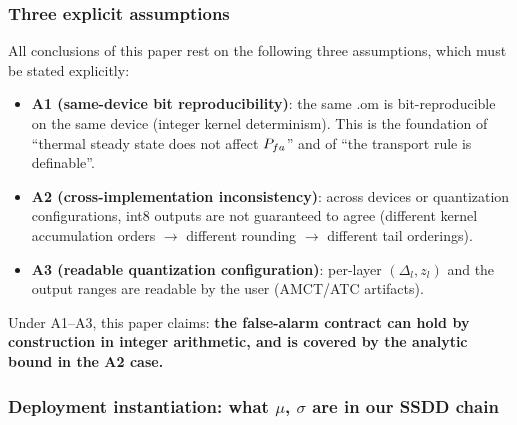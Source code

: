 \subsubsection{Three explicit assumptions}
\label{sec:assumptions}

All conclusions of this paper rest on the following three assumptions, which must be stated explicitly:
\begin{itemize}
\item \textbf{A1 (same-device bit reproducibility)}: the same .om is bit-reproducible on the same device (integer kernel determinism). This is the foundation of ``thermal steady state does not affect $P_{fa}$'' and of ``the transport rule is definable''.
\item \textbf{A2 (cross-implementation inconsistency)}: across devices or quantization configurations, int8 outputs are not guaranteed to agree (different kernel accumulation orders $\to$ different rounding $\to$ different tail orderings).
\item \textbf{A3 (readable quantization configuration)}: per-layer $(\Delta_l,z_l)$ and the output ranges are readable by the user (AMCT/ATC artifacts).
\end{itemize}
Under A1--A3, this paper claims: \textbf{the false-alarm contract can hold by construction in integer arithmetic, and is covered by the analytic bound in the A2 case.}

\subsubsection{Deployment instantiation: what $\mu$, $\sigma$ are in our SSDD chain}
\label{sec:null-inst}

